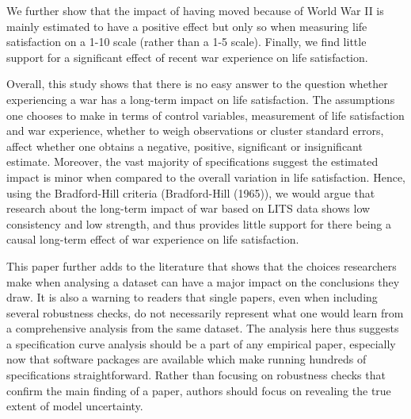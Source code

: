 \documentclass[
  letterpaper,
  DIV=11,
  numbers=noendperiod]{scrartcl}
\begin{document}
We further show that the impact of having moved because of World War II
is mainly estimated to have a positive effect but only so when measuring
life satisfaction on a 1-10 scale (rather than a 1-5 scale). Finally, we
find little support for a significant effect of recent war experience on
life satisfaction.

Overall, this study shows that there is no easy answer to the question
whether experiencing a war has a long-term impact on life satisfaction.
The assumptions one chooses to make in terms of control variables,
measurement of life satisfaction and war experience, whether to weigh
observations or cluster standard errors, affect whether one obtains a
negative, positive, significant or insignificant estimate. Moreover, the
vast majority of specifications suggest the estimated impact is minor
when compared to the overall variation in life satisfaction. Hence,
using the Bradford-Hill criteria (Bradford-Hill (1965)), we would argue
that research about the long-term impact of war based on LITS data shows
low consistency and low strength, and thus provides little support for
there being a causal long-term effect of war experience on life
satisfaction.

This paper further adds to the literature that shows that the choices
researchers make when analysing a dataset can have a major impact on the
conclusions they draw. It is also a warning to readers that single
papers, even when including several robustness checks, do not
necessarily represent what one would learn from a comprehensive analysis
from the same dataset. The analysis here thus suggests a specification
curve analysis should be a part of any empirical paper, especially now
that software packages are available which make running hundreds of
specifications straightforward. Rather than focusing on robustness
checks that confirm the main finding of a paper, authors should focus on
revealing the true extent of model uncertainty.
\end{document}
